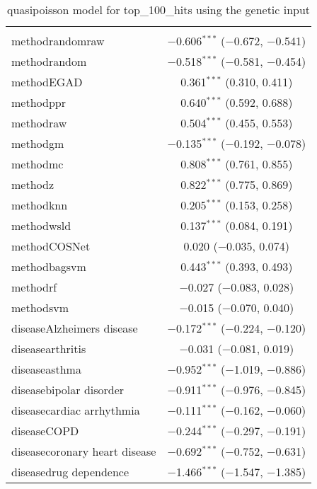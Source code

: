 
\begin{table}[!htbp] \centering 
  \caption{quasipoisson model for top_100_hits using the genetic input} 
  \label{} 
\begin{tabular}{@{\extracolsep{5pt}}lc} 
\\[-1.8ex]\hline 
\hline \\[-1.8ex] 
 methodrandomraw & $-$0.606$^{***}$ ($-$0.672, $-$0.541) \\ 
  methodrandom & $-$0.518$^{***}$ ($-$0.581, $-$0.454) \\ 
  methodEGAD & 0.361$^{***}$ (0.310, 0.411) \\ 
  methodppr & 0.640$^{***}$ (0.592, 0.688) \\ 
  methodraw & 0.504$^{***}$ (0.455, 0.553) \\ 
  methodgm & $-$0.135$^{***}$ ($-$0.192, $-$0.078) \\ 
  methodmc & 0.808$^{***}$ (0.761, 0.855) \\ 
  methodz & 0.822$^{***}$ (0.775, 0.869) \\ 
  methodknn & 0.205$^{***}$ (0.153, 0.258) \\ 
  methodwsld & 0.137$^{***}$ (0.084, 0.191) \\ 
  methodCOSNet & 0.020 ($-$0.035, 0.074) \\ 
  methodbagsvm & 0.443$^{***}$ (0.393, 0.493) \\ 
  methodrf & $-$0.027 ($-$0.083, 0.028) \\ 
  methodsvm & $-$0.015 ($-$0.070, 0.040) \\ 
  diseaseAlzheimers disease & $-$0.172$^{***}$ ($-$0.224, $-$0.120) \\ 
  diseasearthritis & $-$0.031 ($-$0.081, 0.019) \\ 
  diseaseasthma & $-$0.952$^{***}$ ($-$1.019, $-$0.886) \\ 
  diseasebipolar disorder & $-$0.911$^{***}$ ($-$0.976, $-$0.845) \\ 
  diseasecardiac arrhythmia & $-$0.111$^{***}$ ($-$0.162, $-$0.060) \\ 
  diseaseCOPD & $-$0.244$^{***}$ ($-$0.297, $-$0.191) \\ 
  diseasecoronary heart disease & $-$0.692$^{***}$ ($-$0.752, $-$0.631) \\ 
  diseasedrug dependence & $-$1.466$^{***}$ ($-$1.547, $-$1.385) \\ 

\end{tabular}
\end{table}
